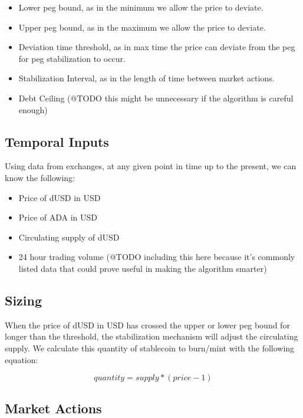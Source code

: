 \documentclass[12pt]{article}
\begin{document}
\begin{itemize}
  \item Lower peg bound, as in the minimum we allow the price to deviate.
  \item Upper peg bound, as in the maximum we allow the price to deviate.
  \item Deviation time threshold, as in max time the price can deviate from the peg for peg stabilization to occur. 
  \item Stabilization Interval, as in the length of time between market actions.
  \item Debt Ceiling (@TODO this might be unnecessary if the algorithm is careful enough)
\end{itemize}


\subsection{Temporal Inputs}

Using data from exchanges, at any given point in time up to the present, we can know the following:
\begin{itemize}
  \item Price of dUSD in USD
  \item Price of ADA in USD
  \item Circulating supply of dUSD
  \item 24 hour trading volume (@TODO including this here because it's commonly listed data that could prove useful in making the algorithm smarter)
\end{itemize}

\subsection{Sizing}

When the price of dUSD in USD has crossed the upper or lower peg bound for longer than the threshold, the stabilization mechanism will adjust the circulating supply. We calculate this quantity of stablecoin to burn/mint with the following equation:

\begin{equation*}
    quantity = supply * (price - 1)
\end{equation*}

\subsection{Market Actions}
\end{document}
